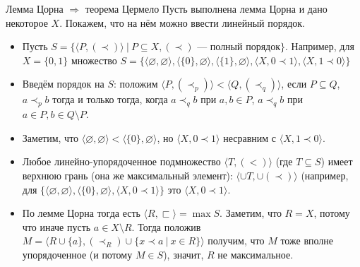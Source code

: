 \documentclass[aspectratio=169]{beamer}
\newtheorem{thm}{Теорема}[section]
\begin{document}
\begin{frame}{Лемма Цорна $\Rightarrow$ теорема Цермело}
Пусть выполнена лемма Цорна и дано некоторое $X$. Покажем, что на нём можно ввести линейный порядок.
\begin{itemize}
\item Пусть $S = \{ \langle P, (\prec)\rangle \ |\ P \subseteq X, (\prec)\text{ --- полный порядок} \}$.
Например, для $X = \{0,1\}$ множество
$S = \{
\langle\varnothing,\varnothing\rangle,
\langle \{0\},\varnothing\rangle,
\langle\{1\},\varnothing\rangle,
\langle X, 0 \prec 1\rangle,
\langle X, 1 \prec 0\rangle
\}$

\item Введём порядок на $S$: положим $\langle P, (\prec_p)\rangle < \langle Q, (\prec_q)\rangle$, если $P \subseteq Q$,
$a \prec_p b$ тогда и только тогда, когда $a \prec_q b$ при $a,b \in P$, $a \prec_q b$ при $a \in P, b \in Q\setminus P$.

\item Заметим, что $\langle \varnothing,\varnothing \rangle < \langle \{0\},\varnothing\rangle$,
но $\langle X, 0 \prec 1\rangle$ несравним с $\langle X, 1 \prec 0\rangle$.

\item Любое линейно-упорядоченное подмножество $\langle T, (<) \rangle$ (где $T \subseteq S$) имеет
верхнюю грань (она же максимальный элемент): $\langle \cup T, \cup(\prec)\rangle$ (например, 
для $\{\langle\varnothing,\varnothing\rangle,
\langle \{0\},\varnothing\rangle,
\langle X, 0 \prec 1\rangle\}$ это $\langle X, 0 \prec 1\rangle$.

\item По лемме Цорна тогда есть $\langle R, \sqsubset\rangle = \max S$. Заметим, что $R = X$, потому что иначе пусть
$a \in X\setminus R$. Тогда положив $M = \langle R\cup\{a\}, (\prec_R)\cup\{x\prec a\ |\ x \in R\} \rangle$
получим, что $M$ тоже вполне упорядоченное (и потому $M \in S$), значит, $R$ не максимальное.
\end{itemize}
\end{frame}
\end{document}
